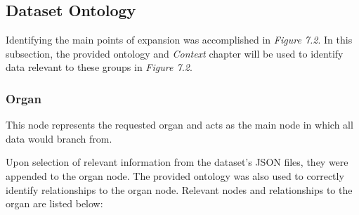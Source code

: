 \subsection{Dataset Ontology}
\hspace*{0.5cm} Identifying the main points of expansion was accomplished in \textit{Figure 7.2}. In this subsection, the provided ontology and \textit{Context} chapter will be used to identify data relevant to these groups in \textit{Figure 7.2}.

\subsubsection{Organ}
\hspace*{0.5cm} This node represents the requested organ and acts as the main node in which all data would branch from.

Upon selection of relevant information from the dataset's JSON files, they were appended to the organ node. The provided ontology was also used to correctly identify relationships to the organ node. Relevant nodes and relationships to the organ are listed below:

